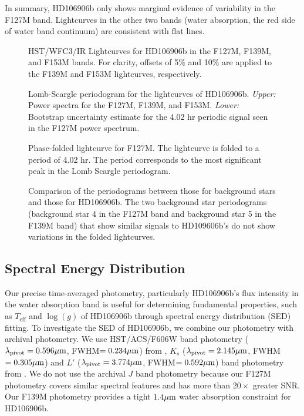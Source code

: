 \documentclass[twocolumn]{aastex62}
\newcommand{\teff}{\ensuremath{T_{\mathrm{eff}}}\xspace}
\newcommand{\logg}{\ensuremath{\log(g)}\xspace}
\begin{document}
In summary, HD106906b only shows marginal  evidence of variability in the F127M band. Lightcurves in the other two bands (water absorption, the red side of water band continuum) are consistent with flat lines.

\begin{figure}[!ht]
  \centering
  \caption{HST/WFC3/IR Lightcurves for HD106906b in the F127M, F139M, and F153M bands. For clarity,  offsets of 5\% and 10\% are applied to the F139M and F153M lightcurves, respectively.}
  \label{fig:lightcurve}
\end{figure}

\begin{figure}[!ht]
  \centering
  \caption{Lomb-Scargle periodogram for the lightcurves of HD106906b. \emph{Upper:} Power spectra for the F127M, F139M, and F153M. \emph{Lower:} Bootstrap uncertainty estimate for the 4.02 hr periodic signal seen in the F127M power spectrum. }
  \label{fig:periodogram}
\end{figure}

\begin{figure}[!ht]
  \centering
  \caption{Phase-folded lightcurve for F127M. The lightcurve is folded to a period of 4.02 hr. The period corresponds to the most significant peak in the Lomb Scargle periodogram.}
  \label{fig:fold}
\end{figure}

\begin{figure}[!ht]
  \centering
  \caption{Comparison of the periodograms between those for background stars and those for HD106906b. The two background star periodograms (background star 4 in the F127M band and background star 5 in the F139M band) that show similar signals to HD109606b's do not show variations in the folded lightcurves.}
  \label{fig:all-periodograms}
\end{figure}


\subsection{Spectral Energy Distribution}
Our precise time-averaged photometry, particularly HD106906b's flux intensity in the water absorption band is useful for determining fundamental properties, such as \teff{} and \logg{} of HD106906b through spectral energy distribution (SED) fitting.  To investigate the SED of HD106906b, we combine our photometry with archival photometry.  We use HST/ACS/F606W band photometry ($\lambda_{\mathrm{pivot}}=0.596\mbox{$\mu$m}$, FWHM$=0.234\mbox{$\mu$m}$) from \citet{Kalas2015}, $K_{s}$ ($\lambda_{\mathrm{pivot}}=2.145\mbox{$\mu$m}$, FWHM$=0.305\mbox{$\mu$m}$) and $L'$ ($\lambda_{\mathrm{pivot}}=3.774\mbox{$\mu$m}$, FWHM$=0.592\mbox{$\mu$m}$) band photometry from \citet{Bailey2013}. We do not use the archival $J$ band photometry \citep{Wu2016} because our F127M photometry covers similar spectral features and has more than $20\times$ greater SNR. Our F139M photometry provides a tight $1.4\mbox{$\mu$m}$ water absorption constraint for HD106906b.
\end{document}
